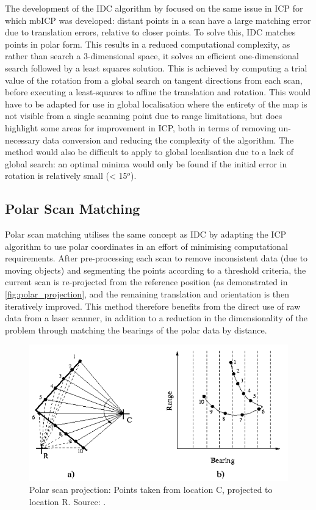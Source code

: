\documentclass[authoryearcitations]{UoYCSproject}
\begin{document}
The development of the IDC algorithm by \citet{Lu1997-zv} focused on the same issue in ICP for which mbICP was developed: distant points in a scan have a large matching error due to translation errors, relative to closer points. To solve this, IDC matches points in polar form. This results in a reduced computational complexity, as rather than search a 3-dimensional space, it solves an efficient one-dimensional search followed by a least squares solution. This is achieved by computing a trial value of the rotation from a global search on tangent directions from each scan, before executing a least-squares to affine the translation and rotation. This would have to be adapted for use in global localisation where the entirety of the map is not visible from a single scanning point due to range limitations, but does highlight some areas for improvement in ICP, both in terms of removing un-necessary data conversion and reducing the complexity of the algorithm. The method would also be difficult to apply to global localisation due to a lack of global search: an optimal minima would only be found if the initial error in rotation is relatively small (< 15$^o$).


\subsection{Polar Scan Matching}
\label{subsec:psm}
Polar scan matching \citet{Diosi2005-nv} utilises the same concept as IDC by adapting the ICP algorithm to use polar coordinates in an effort of minimising computational requirements. After pre-processing each scan to remove inconsistent data (due to moving objects) and segmenting the points according to a threshold criteria, the current scan is re-projected from the reference position (as demonstrated in \autoref{fig:polar_projection}, and the remaining translation and orientation is then iteratively improved. This method therefore benefits from the direct use of raw data from a laser scanner, in addition to a reduction in the dimensionality of the problem through matching the bearings of the polar data by distance. 

\begin{figure}[t]
	\centering
	\includegraphics[width=\textwidth,keepaspectratio]{images/polar_projection.png}
	\caption[Polar Scan projection]{Polar scan projection: Points taken from location C, projected to location R. Source: \citet{Diosi2005-nv}.}
	\label{fig:polar_projection}
\end{figure}
\end{document}
